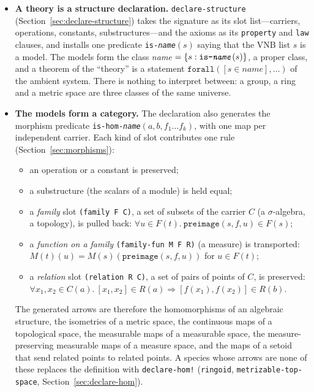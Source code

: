 \begin{itemize}
\item \textbf{A theory is a structure declaration.}  \texttt{declare-structure}
  (Section~\ref{sec:declare-structure}) takes the signature as its slot
  list---carriers, operations, constants, substructures---and the axioms as its
  \texttt{property} and \texttt{law} clauses, and installs one predicate
  \texttt{is-\textit{name}}$(s)$ saying that the VNB list $s$ is a model.
  The models form the class \textit{name} $= \{s : \texttt{is-\textit{name}}(s)\}$,
  a proper class, and a theorem of the ``theory'' is a statement
  $\texttt{forall}([s \in \textit{name}], \ldots)$ of the ambient system.
  There is nothing to interpret between: a group, a ring and a metric space are
  three classes of the same universe.

\item \textbf{The models form a category.}  The declaration also generates the
  morphism predicate \texttt{is-hom-\textit{name}}$(a, b, f_1 \ldots f_k)$, with
  one map per independent carrier.  Each kind of slot contributes one rule
  (Section~\ref{sec:morphisms}):
  \begin{itemize}
  \item an operation or a constant is preserved;
  \item a substructure (the scalars of a module) is held equal;
  \item a \emph{family} slot \texttt{(family F C)}, a set of subsets of the
    carrier $C$ (a $\sigma$-algebra, a topology), is pulled back:
    $\forall u \in F(t).\ \mathtt{preimage}(s, f, u) \in F(s)$;
  \item a \emph{function on a family} \texttt{(family-fun M F R)} (a measure)
    is transported: $M(t)(u) = M(s)(\mathtt{preimage}(s, f, u))$ for
    $u \in F(t)$;
  \item a \emph{relation} slot \texttt{(relation R C)}, a set of pairs of points
    of $C$, is preserved:
    $\forall x_1, x_2 \in C(a).\ [x_1, x_2] \in R(a) \Rightarrow [f(x_1), f(x_2)] \in R(b)$.
  \end{itemize}

  The generated arrows are therefore the homomorphisms of an algebraic
  structure, the isometries of a metric space, the continuous maps of a
  topological space, the measurable maps of a measurable space, the
  measure-preserving measurable maps of a measure space, and the maps of a
  setoid that send related points to related points.  A species whose arrows
  are none of these replaces the definition with \texttt{declare-hom!}
  (\texttt{ringoid}, \texttt{metrizable-top-space},
  Section~\ref{sec:declare-hom}).


\end{itemize}
